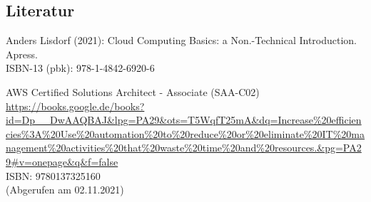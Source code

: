 

%
% 

\thispagestyle{empty}
\subsection*{Literatur}
\renewcommand{\refname}{} %
\begin{comment}
\printbibliography[title={Neue Literatur}]
\end{comment}

\begin{thebibliography}{SW11} %
   Anders Lisdorf (2021): Cloud Computing Basics: a Non.-Technical Introduction. Apress. 
  \\ISBN-13 (pbk): 978-1-4842-6920-6
  
   AWS Certified Solutions Architect - Associate (SAA-C02)\\
  \url{https://books.google.de/books?id=Dp__DwAAQBAJ&lpg=PA29&ots=T5WqfT25mA&dq=Increase%20efficiencies%3A%20Use%20automation%20to%20reduce%20or%20eliminate%20IT%20management%20activities%20that%20waste%20time%20and%20resources.&pg=PA29#v=onepage&q&f=false}
  \\ISBN: 9780137325160
  \\(Abgerufen am 02.11.2021) 

\end{thebibliography}


